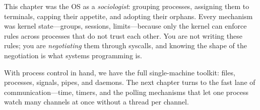 \begin{osconcept}
This chapter was the OS as a \emph{sociologist}: grouping processes,
assigning them to terminals, capping their appetite, and adopting
their orphans. Every mechanism was kernel state---groups, sessions,
limits---because only the kernel can enforce rules across processes
that do not trust each other. You are not writing these rules; you are
\emph{negotiating} them through syscalls, and knowing the shape of the
negotiation is what systems programming is.
\end{osconcept}

With process control in hand, we have the full single-machine toolkit:
files, processes, signals, pipes, and daemons. The next chapter turns
to the fast lane of communication---time, timers, and the polling
mechanisms that let one process watch many channels at once without a
thread per channel.

